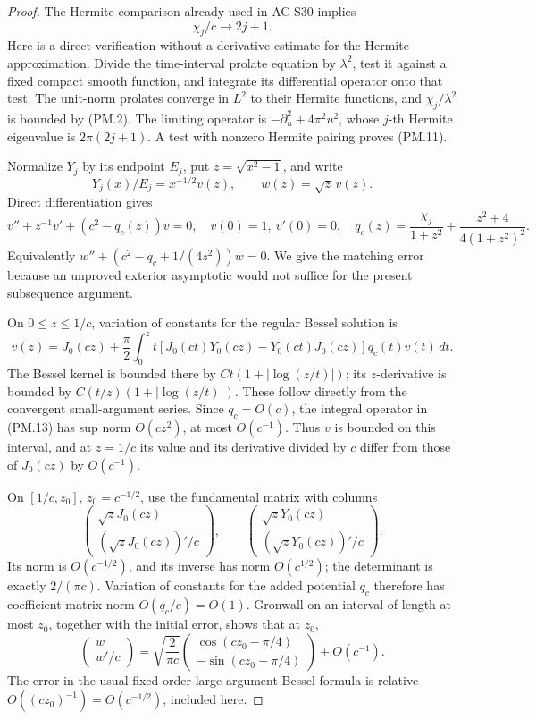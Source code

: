 \begin{proof}
The Hermite comparison already used in AC-S30 implies
\[
                       \chi_j/c\longrightarrow2j+1.
 \tag{PM.11}
\]
Here is a direct verification without a derivative estimate for the
Hermite approximation.  Divide the time-interval prolate equation by
\(\lambda^2\), test it against a fixed compact smooth function, and
integrate its differential operator onto that test.  The unit-norm
prolates converge in \(L^2\) to their Hermite functions, and
\(\chi_j/\lambda^2\) is bounded by (PM.2).  The limiting operator is
\(-\partial_u^2+4\pi^2u^2\), whose \(j\)-th Hermite eigenvalue is
\(2\pi(2j+1)\).  A test with nonzero Hermite pairing proves (PM.11).

Normalize \(Y_j\) by its endpoint \(E_j\), put
\(z=\sqrt{x^2-1}\), and write
\[
 Y_j(x)/E_j=x^{-1/2}v(z),\qquad w(z)=\sqrt z\,v(z).
\]
Direct differentiation gives
\[
 v''+z^{-1}v'+(c^2-q_c(z))v=0,\quad v(0)=1,\ v'(0)=0,
 \quad q_c(z)=\frac{\chi_j}{1+z^2}
                  +\frac{z^2+4}{4(1+z^2)^2}.
 \tag{PM.12}
\]
Equivalently \(w''+(c^2-q_c+1/(4z^2))w=0\).
We give the matching error because an unproved exterior asymptotic
would not suffice for the present subsequence argument.

On \(0\le z\le1/c\), variation of constants for the regular Bessel
solution is
\[
 v(z)=J_0(cz)+\frac\pi2\int_0^z t
       [J_0(ct)Y_0(cz)-Y_0(ct)J_0(cz)]q_c(t)v(t)\,dt.
 \tag{PM.13}
\]
The Bessel kernel is bounded there by
\(Ct(1+|\log(z/t)|)\); its \(z\)-derivative is bounded by
\(C(t/z)(1+|\log(z/t)|)\).
These follow directly from the convergent small-argument series.
Since \(q_c=O(c)\), the integral operator in (PM.13) has sup norm
\(O(cz^2)\), at most \(O(c^{-1})\).  Thus \(v\) is bounded on
this interval, and at \(z=1/c\) its value and its derivative divided
by \(c\) differ from those of \(J_0(cz)\) by \(O(c^{-1})\).

On \([1/c,z_0]\), \(z_0=c^{-1/2}\), use the fundamental matrix
with columns
\[
 \begin{pmatrix}\sqrt z J_0(cz)\\(\sqrt z J_0(cz))'/c\end{pmatrix},
 \qquad
 \begin{pmatrix}\sqrt z Y_0(cz)\\(\sqrt z Y_0(cz))'/c\end{pmatrix}.
\]
Its norm is \(O(c^{-1/2})\), and its inverse has norm
\(O(c^{1/2})\); the determinant is exactly \(2/(\pi c)\).
Variation of constants for the added potential \(q_c\) therefore
has coefficient-matrix norm \(O(q_c/c)=O(1)\).  Gronwall on an
interval of length at most \(z_0\), together with the initial error,
shows that at \(z_0\),
\[
 \begin{pmatrix}w\\w'/c\end{pmatrix}
 =\sqrt{\frac2{\pi c}}
       \begin{pmatrix}\cos(cz_0-\pi/4)\\-\sin(cz_0-\pi/4)\end{pmatrix}
       +O(c^{-1}).
 \tag{PM.14}
\]
The error in the usual fixed-order large-argument Bessel formula is
relative \(O((cz_0)^{-1})=O(c^{-1/2})\), included here.


\end{proof}
